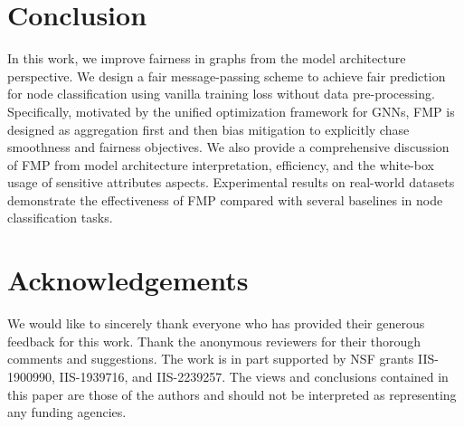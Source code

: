 \documentclass[letterpaper]{article} %
\theoremstyle{plain}
\theoremstyle{definition}
\theoremstyle{remark}
\begin{document}
\section{Conclusion}
In this work, we improve fairness in graphs from the model architecture perspective. We design a fair message-passing scheme to achieve fair prediction for node classification using vanilla training loss without data pre-processing. Specifically,
motivated by the unified optimization framework for GNNs, FMP is designed as aggregation first and then bias mitigation to explicitly chase smoothness and fairness objectives. We also provide a comprehensive discussion of FMP from model architecture interpretation, efficiency, and the white-box usage of sensitive attributes aspects. Experimental results on real-world datasets demonstrate the effectiveness of FMP compared with several baselines in node classification tasks.


\section*{Acknowledgements}
We would like to sincerely thank everyone who has provided their generous feedback for this work. Thank the anonymous reviewers for their thorough comments and suggestions. The work is in part supported by NSF grants
IIS-1900990, IIS-1939716, and IIS-2239257. The views and conclusions
contained in this paper are those of the authors and should
not be interpreted as representing any funding agencies.





\clearpage

\newpage
\appendix
\onecolumn
\end{document}
